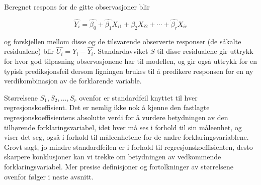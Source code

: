 Beregnet respons for de gitte observasjoner blir

\[ \hat{Y_i}=\hat{{\beta}_0}+\hat{{\beta}_1}X_{i1}+\hat{{\beta}_2}X_{i2}+
                           \cdots +\hat{{\beta}_r}X_{ir}  \]

\noindent og forskjellen mellom disse og de tilsvarende observerte responser
(de såkalte residualene) blir $\hat{U_i}=Y_i-\hat{Y_i}$.
Standardavviket $S$ til disse residualene gir uttrykk for hvor god tilpasning
observasjonene har til modellen, og gir også uttrykk for en typisk
prediksjonsfeil dersom ligningen brukes til å predikere responsen
for en ny verdikombinasjon av de forklarende variable.

Størrelsene $S_1, S_2, \ldots , S_r$ ovenfor er standardfeil
knyttet til hver regresjonskoeffisient.  Det er nemlig ikke nok å kjenne
den fastlagte regre\-sjons\-koef\-fisientens absolutte verdi for å vurdere
betydningen av den tilhørende forklaringsvariabel,
idet hver må ses i forhold til sin måleenhet, og viser det seg,
også i forhold til måleenhetene for de andre forklaringsvariablene.
Grovt sagt, jo mindre standardfeilen er i forhold til regresjonskoeffisienten,
desto skarpere konklusjoner kan vi trekke om betydningen
av vedkommende forklaringsvariabel.
Mer presise definisjoner og fortolkninger av størrelsene ovenfor
følger i neste avsnitt.\\


